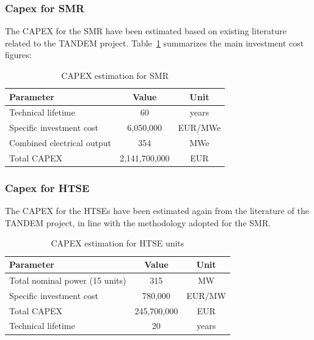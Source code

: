 \subsubsection {Capex for SMR}
The CAPEX for the SMR have been estimated based on existing literature \cite{TANDEM2023} related to the TANDEM project. Table~\ref{tab:esmrs_capex} summarizes the main investment cost figures:

\begin{table}[H]
    \centering
    \begin{tabular}{lcc}
        \hline
        \textbf{Parameter} & \textbf{Value} & \textbf{Unit} \\
        \hline
        Technical lifetime & 60 & years \\
        Specific investment cost & 6,050,000 & EUR/MWe \\
        Combined electrical output & 354 & MWe \\
        Total CAPEX & 2,141,700,000 & EUR \\
        \hline
    \end{tabular}
    \caption{CAPEX estimation for SMR}
    \label{tab:esmrs_capex}
\end{table}

\subsubsection {Capex for HTSE}
The CAPEX for the HTSEs have been estimated again from the literature of the TANDEM project, in line with the methodology adopted for the SMR.

\begin{table}[H]
    \centering
    \begin{tabular}{lcc}
        \hline
        \textbf{Parameter} & \textbf{Value} & \textbf{Unit} \\
        \hline
        Total nominal power (15 units) & 315 & MW \\
        Specific investment cost & 780,000 & EUR/MW \\
        Total CAPEX & 245,700,000 & EUR \\
        Technical lifetime & 20 & years \\
        \hline
    \end{tabular}
    \caption{CAPEX estimation for HTSE units}
    \label{tab:htse_capex}
\end{table}

